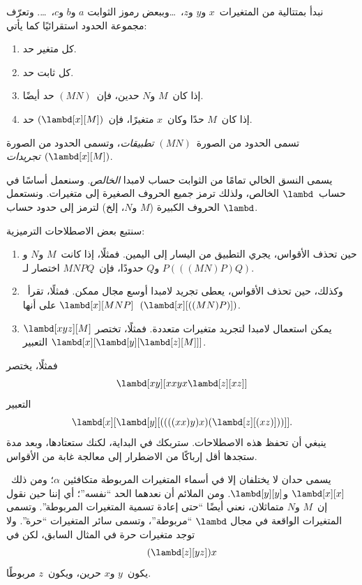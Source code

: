 \documentclass[../../../include/open-logic-section]{subfiles}
\begin{document}

نبدأ بمتتالية من المتغيرات~$x$ و$y$ و$z$،~\dots وببعض رموز الثوابت
$a$ و$b$ و$c$،~\dots. وتعرّف مجموعة الحدود استقرائيًا كما يأتي:
\begin{enumerate}
\item كل متغير حد.
\item كل ثابت حد.
\item إذا كان~$M$ و$N$ حدين، فإن~$(MN)$ حد أيضًا.
\item إذا كان~$M$ حدًا وكان~$x$ متغيرًا، فإن~$(\lambd[x][M])$ حد.
\end{enumerate}
تسمى الحدود من الصورة~$(MN)$ \emph{تطبيقات}، وتسمى الحدود من الصورة
$(\lambd[x][M])$ \emph{تجريدات}.

يسمى النسق الخالي تمامًا من الثوابت حساب لامبدا \emph{الخالص}. وسنعمل
أساسًا في حساب~$\lambd$ الخالص، ولذلك ترمز جميع الحروف الصغيرة إلى
متغيرات. ونستعمل الحروف الكبيرة ($M$ و$N$، إلخ) لترمز إلى حدود حساب
$\lambd$.

سنتبع بعض الاصطلاحات الترميزية:

\begin{conv}
\begin{enumerate}
\item حين تحذف الأقواس، يجري التطبيق من اليسار إلى اليمين. فمثلًا، إذا
  كانت~$M$ و$N$ و$P$ و$Q$ حدودًا، فإن~$MNPQ$ اختصار لـ$(((MN)P)Q)$.
\item وكذلك، حين تحذف الأقواس، يعطى تجريد لامبدا أوسع مجال ممكن. فمثلًا،
  تقرأ~$\lambd[x][MNP]$ على أنها~$(\lambd[x][((MN)P)])$.
\item يمكن استعمال لامبدا لتجريد متغيرات متعددة. فمثلًا، تختصر
  $\lambd[xyz][M]$ التعبير
  $\lambd[x][\lambd[y][\lambd[z][M]]]$.
\end{enumerate}
\end{conv}

فمثلًا، يختصر
\[
\lambd[xy][xxyx \lambd[z][xz]]
\]
التعبير
\[
\lambd[x][\lambd[y][((((xx)y)x)(\lambd[z][(xz)]))]].
\]
ينبغي أن تحفظ هذه الاصطلاحات. ستربكك في البداية، لكنك ستعتادها، وبعد
مدة ستجدها أقل إرباكًا من الاضطرار إلى معالجة غابة من الأقواس.

يسمى حدان لا يختلفان إلا في أسماء المتغيرات المربوطة متكافئين
$\alpha$؛ ومن ذلك~$\lambd[x][x]$ و$\lambd[y][y]$. ومن الملائم أن نعدهما
الحد ``نفسه''؛ أي إننا حين نقول إن~$M$ و$N$ متماثلان، نعني أيضًا
``حتى إعادة تسمية المتغيرات المربوطة''. وتسمى المتغيرات الواقعة في مجال
$\lambd$ ``مربوطة''، وتسمى سائر المتغيرات ``حرة''. ولا توجد متغيرات حرة
في المثال السابق، لكن في
\[
(\lambd[z][yz])x
\]
يكون~$y$ و$x$ حرين، ويكون~$z$ مربوطًا.
\end{document}
